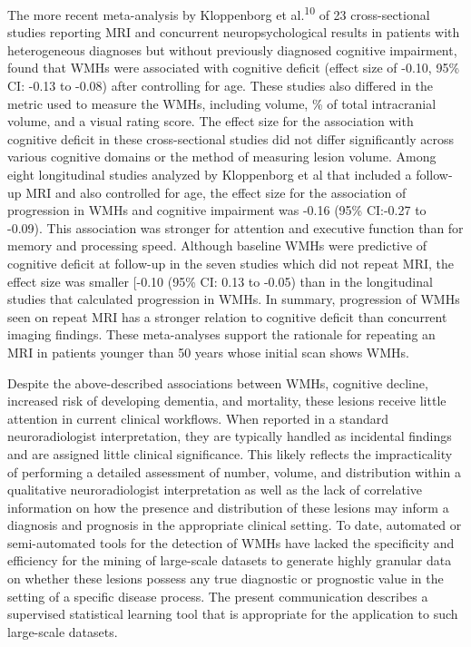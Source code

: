 \documentclass[11pt,]{article}
\begin{document}
The more recent meta-analysis by Kloppenborg et al.\textsuperscript{10}
of 23 cross-sectional studies reporting MRI and concurrent
neuropsychological results in patients with heterogeneous diagnoses but
without previously diagnosed cognitive impairment, found that WMHs were
associated with cognitive deficit (effect size of -0.10, 95\% CI: -0.13
to -0.08) after controlling for age. These studies also differed in the
metric used to measure the WMHs, including volume, \% of total
intracranial volume, and a visual rating score. The effect size for the
association with cognitive deficit in these cross-sectional studies did
not differ significantly across various cognitive domains or the method
of measuring lesion volume. Among eight longitudinal studies analyzed by
Kloppenborg et al that included a follow-up MRI and also controlled for
age, the effect size for the association of progression in WMHs and
cognitive impairment was -0.16 (95\% CI:-0.27 to -0.09). This
association was stronger for attention and executive function than for
memory and processing speed. Although baseline WMHs were predictive of
cognitive deficit at follow-up in the seven studies which did not repeat
MRI, the effect size was smaller {[}-0.10 (95\% CI: 0.13 to -0.05) than
in the longitudinal studies that calculated progression in WMHs. In
summary, progression of WMHs seen on repeat MRI has a stronger relation
to cognitive deficit than concurrent imaging findings. These
meta-analyses support the rationale for repeating an MRI in patients
younger than 50 years whose initial scan shows WMHs.

Despite the above-described associations between WMHs, cognitive
decline, increased risk of developing dementia, and mortality, these
lesions receive little attention in current clinical workflows. When
reported in a standard neuroradiologist interpretation, they are
typically handled as incidental findings and are assigned little
clinical significance. This likely reflects the impracticality of
performing a detailed assessment of number, volume, and distribution
within a qualitative neuroradiologist interpretation as well as the lack
of correlative information on how the presence and distribution of these
lesions may inform a diagnosis and prognosis in the appropriate clinical
setting. To date, automated or semi-automated tools for the detection of
WMHs have lacked the specificity and efficiency for the mining of
large-scale datasets to generate highly granular data on whether these
lesions possess any true diagnostic or prognostic value in the setting
of a specific disease process. The present communication describes a
supervised statistical learning tool that is appropriate for the
application to such large-scale datasets.
\end{document}
